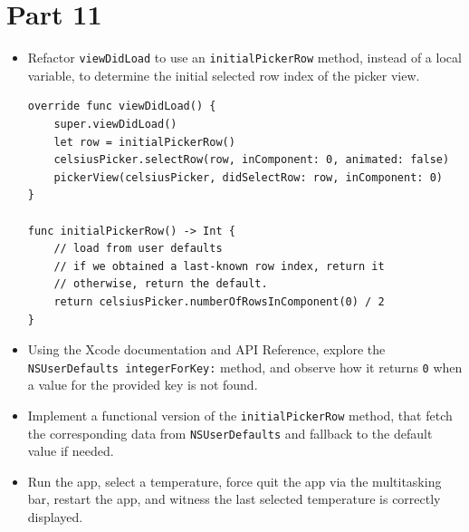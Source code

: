 \documentclass[a4paper,11pt]{scrartcl}
\begin{document}
\section*{Part 11}

\begin{itemize}
\item Refactor \texttt{viewDidLoad} to use an \texttt{initialPickerRow} method, instead of a local variable, to determine the initial selected row index of the picker view.
\begin{lstlisting}
override func viewDidLoad() {
	super.viewDidLoad()
	let row = initialPickerRow()
	celsiusPicker.selectRow(row, inComponent: 0, animated: false)
	pickerView(celsiusPicker, didSelectRow: row, inComponent: 0)
}

func initialPickerRow() -> Int {
	// load from user defaults
	// if we obtained a last-known row index, return it
	// otherwise, return the default.
	return celsiusPicker.numberOfRowsInComponent(0) / 2
}
\end{lstlisting}
\item Using the Xcode documentation and API Reference, explore the \texttt{NSUserDefaults integerForKey:} method, and observe how it returns \texttt{0} when a value for the provided key is not found.
\item Implement a functional version of the \texttt{initialPickerRow} method, that fetch the corresponding data from \texttt{NSUserDefaults} and fallback to the default value if needed.
\item Run the app, select a temperature, force quit the app via the multitasking bar, restart the app, and witness the last selected temperature is correctly displayed.
\end{itemize}
\end{document}
